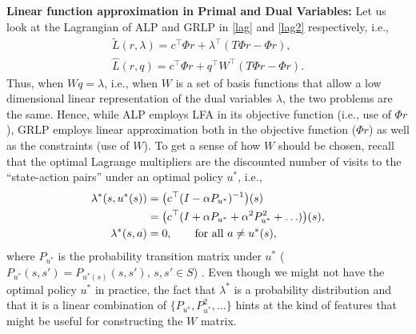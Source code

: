 \textbf{Linear function approximation in Primal and Dual Variables:} Let us look at the Lagrangian of ALP and GRLP in
\eqref{lag} and \eqref{lag2} respectively, i.e.,
\begin{align}\label{lag}
\tilde{L}(r,\lambda)=c^\top \Phi r+\lambda^\top (T\Phi r-\Phi r), \\ \label{lag2}\hat{L}(r,q)=c^\top \Phi r+q^\top W^\top (T\Phi r-\Phi r).
\end{align}
Thus, when $Wq = \lambda$, i.e., when $W$ is a set of basis functions that allow
a low dimensional linear representation of the dual variables $\lambda$,
the two problems are the same.
Hence, while ALP employs LFA in its objective function (i.e., use of $\Phi r$), GRLP employs linear approximation both in the objective function ($\Phi r$) as well as the constraints (use of $W$).
To get a sense of how $W$ should be chosen, recall that
the optimal Lagrange multipliers are the discounted number of visits to the ``state-action pairs'' under an optimal policy $u^*$, i.e.,
\begin{align}
\lambda^*(s,u^*(s))&=\big(c^\top(I-\alpha P_{u^*})^{-1}\big)(s)\nonumber\\
&= \big(c^\top(I+\alpha P_{u^*}+\alpha^2 P_{u^*}^2+\ldots)\big)(s),\nonumber\\
\lambda^*(s,a)&=0, \qquad \text{for all } a \neq u^*(s),\nonumber
\end{align}
where $P_{u^*}$ is the probability transition matrix under $u^*$ ($P_{u^*}(s,s') = P_{u^*(s)}(s,s')$, $s,s'\in S$) \cite{dolgov}. Even though we might not have the optimal policy $u^*$ in practice, the fact that $\lambda^*$ is a probability distribution and that it is a linear combination of $\{P_{u^*},P^2_{u^*},\ldots\}$ hints at the kind of features that might be useful for constructing the $W$ matrix.
\fi
